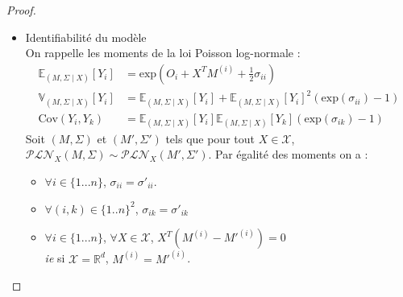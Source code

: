 \documentclass[11pt,table]{beamer}
\begin{document}
\begin{frame}
\begin{proof}
\begin{itemize}
\item Identifiabilité du modèle \\
On rappelle les moments de la loi Poisson log-normale :
\begin{align*}
\mathbb{E}_{(M,\Sigma \mid X)} [Y_i] &= \mathrm{exp}(O_i + X^T M^{(i)} + \frac{1}{2} \sigma_{ii} )\\
\mathbb{V}_{(M,\Sigma \mid X)} [Y_i]& =\mathbb{E}_{(M,\Sigma \mid X)} [Y_i]+\mathbb{E}_{(M,\Sigma \mid X)} [Y_i]^2(\mathrm{exp}(\sigma_{ii})-1)\\
\mathrm{Cov}(Y_i,Y_k)& =\mathbb{E}_{(M,\Sigma \mid X)} [Y_i]\mathbb{E}_{(M,\Sigma \mid X)} [Y_k](\mathrm{exp}(\sigma_{ik}) - 1)
\end{align*}
Soit $(M,\Sigma)$ et $(M', \Sigma')$ tels que pour tout $X \in \mathcal{X}$,$\mathcal{PLN}_X(M,\Sigma)\sim \mathcal{PLN}_X(M',\Sigma')$. Par égalité des moments on a :
\begin{itemize}
\item $ \forall i \in \{1...n\}$, $\sigma_{ii} = \sigma'_{ii}$.
\item $\forall (i,k) \in \{1..n\}^2$, $\sigma_{ik} = \sigma'_{ik}$
\item  $ \forall i \in \{1...n\}$, $ \forall X \in \mathcal{X}$, $X^T (M^{(i)}-M'^{(i)})=0$\\
\textit{ie} si $\mathcal{X}= \mathbb{R}^d$, $M^{(i)} = M'^{(i)}$.
\end{itemize}
\end{itemize}
\end{proof}
\end{frame}
\end{document}
